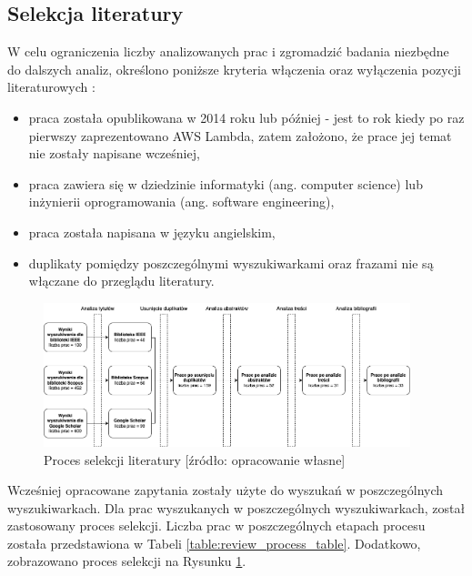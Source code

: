 \subsection{Selekcja literatury}\label{chapter:selekcja_literatury}

W celu ograniczenia liczby analizowanych prac i zgromadzić badania niezbędne do dalszych analiz, określono poniższe kryteria włączenia oraz wyłączenia pozycji literaturowych \cite{cartaxo2020rapidreviewssoftwareengineering}:
\begin{itemize}
    \item praca została opublikowana w 2014 roku lub później - jest to rok kiedy po raz pierwszy zaprezentowano AWS Lambda, zatem założono, że prace jej temat nie zostały napisane wcześniej,
    \item praca zawiera się w dziedzinie informatyki (ang. computer science) lub inżynierii oprogramowania (ang. software engineering),
    \item praca została napisana w języku angielskim,
    \item duplikaty pomiędzy poszczególnymi wyszukiwarkami oraz frazami nie są włączane do przeglądu literatury.
\end{itemize}

\begin{figure}[h]
    \centering
    \includegraphics[width=0.95\textwidth]{charts/literature_review_process.drawio.png}
    \caption{Proces selekcji literatury [źródło: opracowanie własne]}
    \label{fig:literature_review_process}
\end{figure}



Wcześniej opracowane zapytania zostały użyte do wyszukań w poszczególnych wyszukiwarkach. 
Dla prac wyszukanych w poszczególnych wyszukiwarkach, został zastosowany proces selekcji.
Liczba prac w poszczególnych etapach procesu została przedstawiona w Tabeli \ref{table:review_process_table}.
Dodatkowo, zobrazowano proces selekcji na Rysunku \ref{fig:literature_review_process}.

